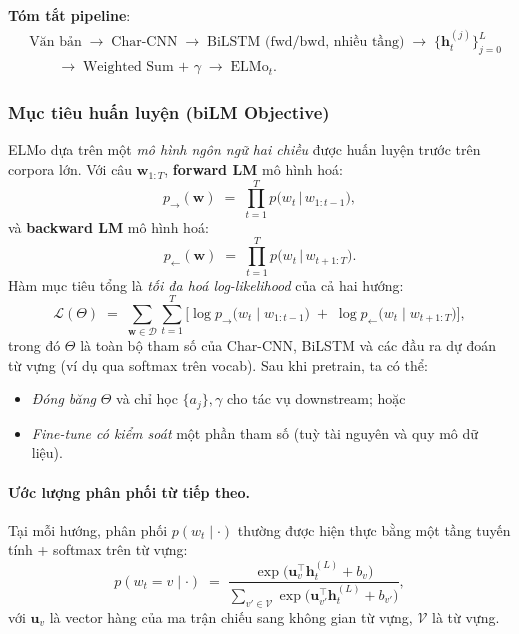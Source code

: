 \noindent\textbf{Tóm tắt pipeline}:
\[
  \begin{aligned}
    &\text{Văn bản} \;\to\; \text{Char-CNN} \;\to\; \text{BiLSTM (fwd/bwd, nhiều tầng)} \;\to\;
    \{\mathbf{h}_t^{(j)}\}_{j=0}^{L} \\
    &\qquad \to\; \text{Weighted Sum + }\gamma \;\to\; \text{ELMo}_t.
  \end{aligned}
\]

\subsubsection{Mục tiêu huấn luyện (biLM Objective)}
\label{ssec:elmo_training}

ELMo dựa trên một \emph{mô hình ngôn ngữ hai chiều} được huấn luyện trước trên corpora lớn. Với câu $\mathbf{w}_{1:T}$, \textbf{forward LM} mô hình hoá:
\[
  p_{\rightarrow}(\mathbf{w}) \;=\; \prod_{t=1}^{T} p\big(w_t \,\big|\, w_{1:t-1}\big),
\]
và \textbf{backward LM} mô hình hoá:
\[
  p_{\leftarrow}(\mathbf{w}) \;=\; \prod_{t=1}^{T} p\big(w_t \,\big|\, w_{t+1:T}\big).
\]
Hàm mục tiêu tổng là \emph{tối đa hoá log-likelihood} của cả hai hướng:
\[
  \mathcal{L}(\Theta) 
  \;=\; \sum_{\mathbf{w}\in\mathcal{D}}
  \sum_{t=1}^{T} 
  \Big[
    \log p_{\rightarrow}\big(w_t \mid w_{1:t-1}\big) 
    \;+\; 
    \log p_{\leftarrow}\big(w_t \mid w_{t+1:T}\big)
  \Big],
\]
trong đó $\Theta$ là toàn bộ tham số của Char-CNN, BiLSTM và các đầu ra dự đoán từ vựng (ví dụ qua softmax trên vocab). Sau khi pretrain, ta có thể:
\begin{itemize}
  \item \emph{Đóng băng} $\Theta$ và chỉ học $\{a_j\},\gamma$ cho tác vụ downstream; hoặc
  \item \emph{Fine-tune có kiểm soát} một phần tham số (tuỳ tài nguyên và quy mô dữ liệu).
\end{itemize}

\paragraph{Ước lượng phân phối từ tiếp theo.}
Tại mỗi hướng, phân phối $p(w_t \mid \cdot)$ thường được hiện thực bằng một tầng tuyến tính + softmax trên từ vựng:
\[
  p(w_t = v \mid \cdot) \;=\; 
  \frac{\exp\big(\mathbf{u}_v^\top \mathbf{h}_t^{(L)} + b_v\big)}
       {\sum_{v'\in \mathcal{V}} \exp\big(\mathbf{u}_{v'}^\top \mathbf{h}_t^{(L)} + b_{v'}\big)},
\]
với $\mathbf{u}_v$ là vector hàng của ma trận chiếu sang không gian từ vựng, $\mathcal{V}$ là từ vựng.

